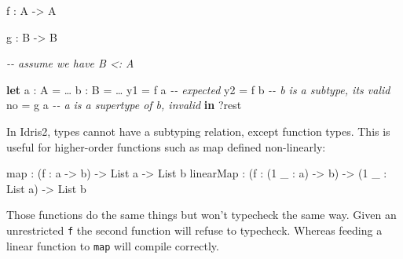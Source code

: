 \documentclass[
]{article}
\newenvironment{Shaded}{}{}
\newcommand{\CommentTok}[1]{\textcolor[rgb]{0.38,0.63,0.69}{\textit{#1}}}
\newcommand{\DataTypeTok}[1]{\textcolor[rgb]{0.56,0.13,0.00}{#1}}
\newcommand{\DecValTok}[1]{\textcolor[rgb]{0.25,0.63,0.44}{#1}}
\newcommand{\FunctionTok}[1]{\textcolor[rgb]{0.02,0.16,0.49}{#1}}
\newcommand{\KeywordTok}[1]{\textcolor[rgb]{0.00,0.44,0.13}{\textbf{#1}}}
\newcommand{\NormalTok}[1]{#1}
\newcommand{\OperatorTok}[1]{\textcolor[rgb]{0.40,0.40,0.40}{#1}}
\newcommand{\OtherTok}[1]{\textcolor[rgb]{0.00,0.44,0.13}{#1}}
\begin{document}
\begin{Shaded}
\begin{Highlighting}[]

\NormalTok{f }\OperatorTok{:} \DataTypeTok{A} \OtherTok{{-}\textgreater{}} \DataTypeTok{A}

\NormalTok{g }\OperatorTok{:} \DataTypeTok{B} \OtherTok{{-}\textgreater{}} \DataTypeTok{B}

\CommentTok{{-}{-} assume we have B \textless{}: A}

\KeywordTok{let}\NormalTok{ a }\OperatorTok{:} \DataTypeTok{A} \OtherTok{=}\NormalTok{ …}
\NormalTok{    b }\OperatorTok{:} \DataTypeTok{B} \OtherTok{=}\NormalTok{ … }
\NormalTok{    y1 }\OtherTok{=}\NormalTok{ f a }\CommentTok{{-}{-} expected}
\NormalTok{    y2 }\OtherTok{=}\NormalTok{ f b }\CommentTok{{-}{-} b is a subtype, it\textquotesingle{}s valid}
\NormalTok{    no }\OtherTok{=}\NormalTok{ g a }\CommentTok{{-}{-} a is a supertype of b, invalid}
 \KeywordTok{in} \OperatorTok{?}\NormalTok{rest}
\end{Highlighting}
\end{Shaded}

In Idris2, types cannot have a subtyping relation, except function
types. This is useful for higher-order functions such as map defined
non-linearly:

\begin{Shaded}
\begin{Highlighting}[]
\FunctionTok{map} \OperatorTok{:}\NormalTok{ (f }\OperatorTok{:}\NormalTok{ a }\OtherTok{{-}\textgreater{}}\NormalTok{ b) }\OtherTok{{-}\textgreater{}} \DataTypeTok{List}\NormalTok{ a }\OtherTok{{-}\textgreater{}} \DataTypeTok{List}\NormalTok{ b}
\NormalTok{linearMap }\OperatorTok{:}\NormalTok{ (f }\OperatorTok{:}\NormalTok{ (}\DecValTok{1}\NormalTok{ \_ }\OperatorTok{:}\NormalTok{ a) }\OtherTok{{-}\textgreater{}}\NormalTok{ b) }\OtherTok{{-}\textgreater{}}\NormalTok{ (}\DecValTok{1}\NormalTok{ \_ }\OperatorTok{:} \DataTypeTok{List}\NormalTok{ a) }\OtherTok{{-}\textgreater{}} \DataTypeTok{List}\NormalTok{ b}
\end{Highlighting}
\end{Shaded}

Those functions do the same things but won't typecheck the same way.
Given an unrestricted \texttt{f} the second function will refuse to
typecheck. Whereas feeding a linear function to \texttt{map} will
compile correctly.
\end{document}

